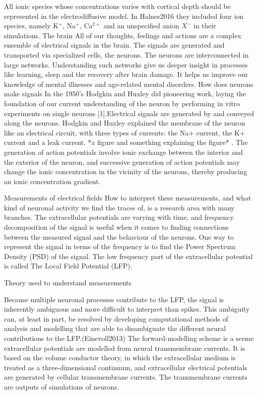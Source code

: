 \documentclass{article}
\begin{document}
All ionic species whose concentrations varies with cortical depth should be represented in the electrodiffusive model. In Halnes2016 they included four ion species, namely K$^+$, Na$^+$, Ca$^{2+}$ and an unspecified anion $X^-$ in their simulations.
{The brain}
All of our thoughts, feelings and actions are a complex ensemble of electrical signals in the brain. The signals are generated and transported via specialized cells, the neurons. The neurons are interconnected in large networks. Understanding such networks give us deeper insight in processes like learning, sleep and the recovery after brain damage. It helps us improve our knowledge of mental illnesses and age-related mental disorders.
{How does neurons make signals}
In the 1950’s Hodgkin and Huxley did pioneering work, laying the foundation of our current understanding of the neuron by performing in vitro experiments on single neurons [1].Electrical signals are generated by and conveyed along the neurons. Hodgkin and Huxley explained the membrane of the neuron like an electrical circuit, with three types of currents: the Na+ current, the K+ current and a leak current. *a figure and something explaining the figure* . The generation of action potentials involve ionic exchange between the interior and the exterior of the neuron, and successive generation of action potentials may change the ionic concentration in the vicinity of the neurons, thereby producing an ionic concentration gradient.

{Measurements of electrical fields}
 How to interpret these measurements, and what kind of neuronal activity we find the traces of, is a research area with many branches. The extracellular potentials are varying with time, and frequency decomposition of the signal is useful when it comes to finding connections between the measured signal and the behaviour of the neurons. One way to represent the signal in terms of the frequency is to find the Power Spectrum Density (PSD) of the signal. The low frequency part of the extracellular potential is called The Local Field Potential (LFP). 

{Theory used to understand measurements}

Because multiple neuronal processes contribute to the LFP, the signal is inherently ambiguous and more difficult to interpret than spikes. This ambiguity can, at least in part, be resolved by developing computational methods of analysis and modelling that are able to disambiguate the different
neural contributions to the LFP.(Einevoll2013)  The forward-modelling scheme is a sceme extracellular potentials are modelled from neural
transmembrane currents. It is based on the volume conductor theory, in which the extracellular medium is treated as a
three-dimensional continuum, and extracellular electrical potentials are
generated by cellular transmembrane currents. The transmembrane currents are outputs of simulations of neurons.
\end{document}
